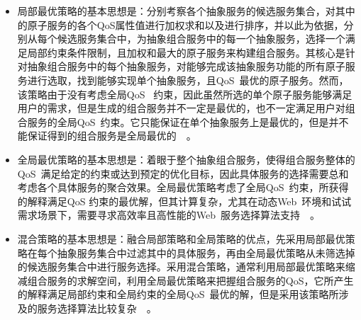 \begin{itemize}

\item 局部最优策略的基本思想是：分别考察各个抽象服务的候选服务集合，对其中的原子服务的各个QoS属性值进行加权求和以及进行排序，并以此为依据，分别从每个候选服务集合中，为抽象组合服务中的每一个抽象服务，选择一个满足局部约束条件限制，且加权和最大的原子服务来构建组合服务。其核心是针对抽象组合服务中的每个抽象服务，对能够完成该抽象服务功能的所有原子服务进行选取，找到能够实现单个抽象服务，且QoS~最优的原子服务。然而，该策略由于没有考虑全局QoS~ 约束，因此虽然所选的单个原子服务能够满足用户的需求，但是生成的组合服务并不一定是最优的，也不一定满足用户对组合服务的全局QoS~约束。它只能保证在单个抽象服务上是最优的，但是并不能保证得到的组合服务是全局最优的~\cite{sun2011qssa,sgwang2011gdecomqos,alrifai2009scalable}~。

\item 全局最优策略的基本思想是：着眼于整个抽象组合服务，使得组合服务整体的QoS~满足给定的约束或达到预定的优化目标，因此具体服务的选择需要总和考虑各个具体服务的聚合效果。全局最优策略考虑了全局QoS~约束，所获得的解释满足QoS 约束的最优解，但其计算复杂，尤其在动态Web~环境和试试需求场景下，需要寻求高效率且高性能的Web~服务选择算法支持~\cite{shliu2007gaqos}~。

\item 混合策略的基本思想是：融合局部策略和全局策略的优点，先采用局部最优策略在每个抽象服务集合中过滤其中的具体服务，再由全局最优策略从未筛选掉的候选服务集合中进行服务选择。采用混合策略，通常利用局部最优策略来缩减组合服务的求解空间，利用全局最优策略来把握组合服务的QoS，它所产生的解释满足局部约束和全局约束的全局QoS~最优的解，但是采用该策略所涉及的服务选择算法比较复杂~\cite{alrifai2009combining}~。
\end{itemize}

